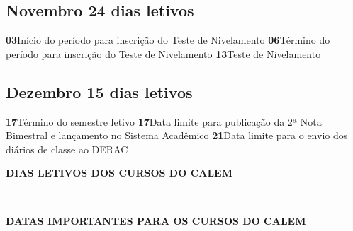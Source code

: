 \documentclass[thesis]{hmcposter}
\begin{document}
\begin{poster}
							\subsection{Novembro \hfill 24 dias letivos}\textbf{03}\qquad Início do período para inscrição do Teste de Nivelamento \newline \null\textbf{06}\qquad Término do período para inscrição do Teste de Nivelamento \newline \null\textbf{13}\qquad Teste de Nivelamento \newline \null\subsection{Dezembro \hfill 15 dias letivos}\textbf{17}\qquad Término do semestre letivo \newline \null\textbf{17}\qquad Data limite para publicação da 2ª Nota Bimestral e lançamento no Sistema Acadêmico \newline \null\textbf{21}\qquad Data limite para o envio dos diários de classe ao DERAC \newline \null\newpage
~
\vfill
\begin{center}
\large \textbf{DIAS LETIVOS DOS CURSOS DO CALEM}
\newline
\null
\newline
\begin{table}
\centering
{}
\end{table}
\newline
\null
\newline
\end{center}
\vfill
\null
\columnbreak
~
\vfill
\begin{center}
\large \textbf{DATAS IMPORTANTES PARA OS CURSOS DO CALEM}
\newline
\null
\newline
\begin{table}

\end{table}
\end{center}
\end{poster}
\end{document}
